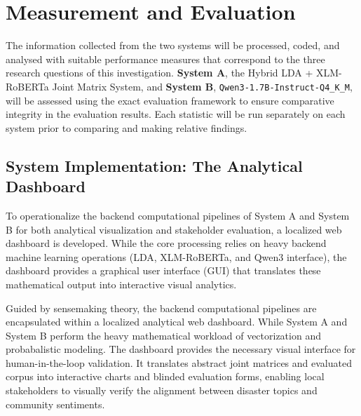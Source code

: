 \documentclass[12pt,a4paper]{report}
\newcommand{\sysA}{\textbf{System A}}
\newcommand{\sysB}{\textbf{System B}}
\newcommand{\qwen}{\texttt{Qwen3-1.7B-Instruct-Q4\_K\_M}}
\newcommand{\xlmr}{XLM-RoBERTa}
\begin{document}
\section{Measurement and Evaluation}

The information collected from the two systems will be processed, coded, and
analysed with suitable performance measures that correspond to the three
research questions of this investigation. \sysA, the Hybrid LDA + \xlmr{} Joint
Matrix System, and \sysB, \qwen, will be assessed using the exact evaluation
framework to ensure comparative integrity in the evaluation results. Each
statistic will be run separately on each system prior to comparing and making
relative findings.

\subsection{System Implementation: The Analytical Dashboard}

To operationalize the backend computational pipelines of System A and System B for both analytical visualization
and stakeholder evaluation, a localized web dashboard is developed. While the core processing relies on heavy backend machine learning operations (LDA, XLM-RoBERTa, and Qwen3 interface), the dashboard provides a graphical user interface (GUI) that translates these mathematical output into interactive visual analytics.

Guided by sensemaking theory, the backend computational pipelines are encapsulated within a localized analytical web dashboard. While System A and System B perform the heavy mathematical workload of vectorization and probabalistic modeling. The dashboard provides the necessary visual interface for human-in-the-loop validation. It translates abstract joint matrices and evaluated corpus into interactive charts and blinded evaluation forms, enabling local stakeholders to visually verify the alignment between disaster topics and community sentiments.
\end{document}
